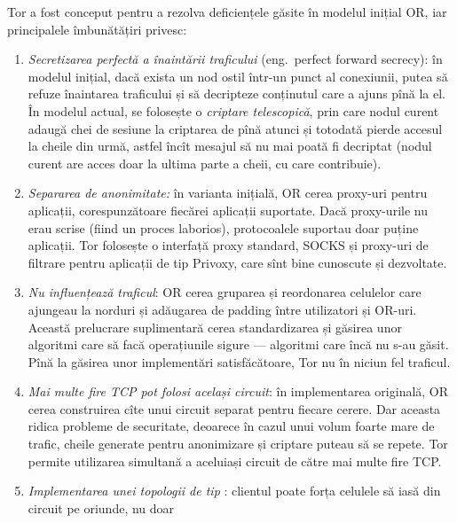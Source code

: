 Tor a fost conceput pentru a rezolva deficiențele găsite în modelul inițial OR,
iar principalele îmbunătățiri privesc:
\begin{enumerate}[(1)]
  \item \textit{Secretizarea perfectă a înaintării traficului} (eng.\ perfect
    forward secrecy): în modelul inițial, dacă exista un nod ostil într-un punct
    al conexiunii, putea să refuze înaintarea traficului și să decripteze
    conținutul care a ajuns pînă la el. În modelul actual, se folosește o
    \emph{criptare telescopică}, prin care nodul curent adaugă chei
    de sesiune la criptarea de pînă atunci și totodată pierde accesul la cheile din
    urmă, astfel încît mesajul să nu mai poată fi decriptat (nodul curent are
    acces doar la ultima parte a cheii, cu care contribuie).
  \item \textit{Separarea  de anonimitate:} în varianta
    inițială, OR cerea proxy-uri pentru aplicații, corespunzătoare fiecărei
    aplicații suportate. Dacă proxy-urile nu erau scrise (fiind un proces laborios),
    protocoalele suportau doar puține aplicații. Tor folosește o interfață
    proxy standard, SOCKS și proxy-uri de filtrare pentru aplicații de tip
    Privoxy, care sînt bine cunoscute și dezvoltate.
  \item \textit{Nu influențează traficul}: OR cerea gruparea și reordonarea
    celulelor care ajungeau la norduri și adăugarea de padding între utilizatori
    și OR-uri. 
    Această prelucrare suplimentară cerea standardizarea și găsirea unor algoritmi
    care să facă operațiunile sigure --- algoritmi care încă nu s-au găsit. Pînă
    la găsirea unor implementări satisfăcătoare, Tor nu  în niciun
    fel traficul.
  \item \textit{Mai multe fire TCP pot folosi același circuit}: în implementarea
    originală, OR cerea construirea cîte unui circuit separat pentru
    fiecare cerere. Dar aceasta ridica probleme de securitate, deoarece
    în cazul unui volum foarte mare de trafic, cheile generate pentru
    anonimizare și criptare puteau să se repete. Tor permite utilizarea
    simultană a aceluiași circuit de către mai multe fire TCP.
  \item \textit{Implementarea unei topologii de tip }:
    clientul poate forța celulele să iasă din circuit pe oriunde, nu doar

\end{enumerate}
